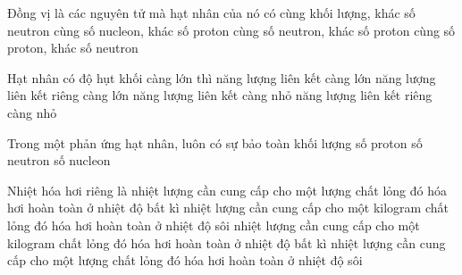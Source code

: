	\begin{ex}%
		Đồng vị là các nguyên tử mà hạt nhân của nó có
		\choice
		{cùng khối lượng, khác số neutron}
		{cùng số nucleon, khác số proton}
		{cùng số neutron, khác số proton}
		{\True cùng số proton, khác số neutron}
	\end{ex}

	\begin{ex}%
		Hạt nhân có độ hụt khối càng lớn thì
		\choice
		{\True năng lượng liên kết càng lớn}
		{năng lượng liên kết riêng càng lớn}
		{năng lượng liên kết càng nhỏ}
		{năng lượng liên kết riêng càng nhỏ}
	\end{ex}

	\begin{ex}%
		Trong một phản ứng hạt nhân, luôn có sự bảo toàn
		\choice
		{khối lượng}
		{số proton}
		{số neutron}
		{\True số nucleon}
	\end{ex}

	\begin{ex}%
		Nhiệt hóa hơi riêng là
		\choice
		{nhiệt lượng cần cung cấp cho một lượng chất lỏng đó hóa hơi hoàn toàn ở nhiệt độ bất kì}
		{\True nhiệt lượng cần cung cấp cho một kilogram chất lỏng đó hóa hơi hoàn toàn ở nhiệt độ sôi}
		{nhiệt lượng cần cung cấp cho một kilogram chất lỏng đó hóa hơi hoàn toàn ở nhiệt độ bất kì}
		{nhiệt lượng cần cung cấp cho một lượng chất lỏng đó hóa hơi hoàn toàn ở nhiệt độ sôi}
	\end{ex}

